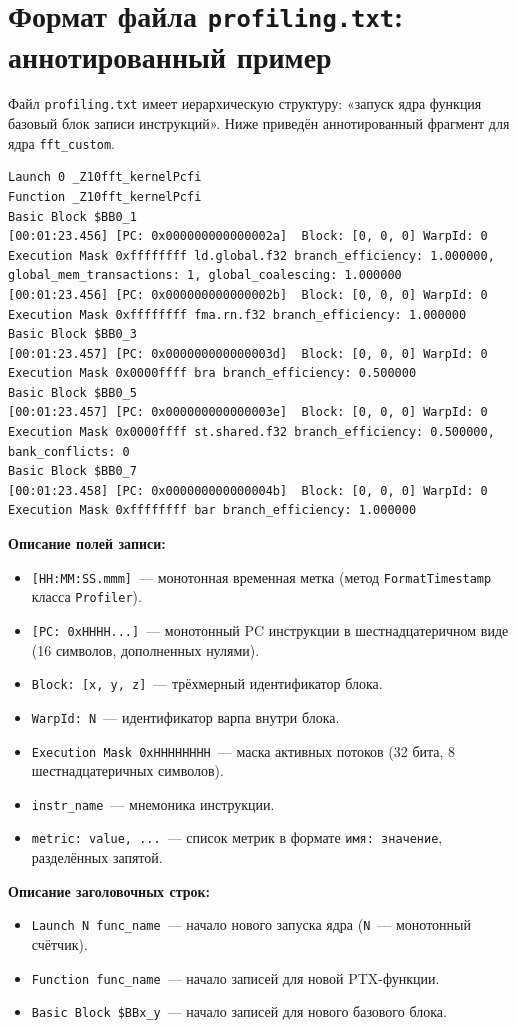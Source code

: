 \section{Формат файла \texttt{profiling.txt}: аннотированный пример}
\label{app:profiling_format}

Файл \texttt{profiling.txt} имеет иерархическую структуру:
«запуск ядра \textrightarrow{} функция \textrightarrow{} базовый блок \textrightarrow{} записи инструкций».
Ниже приведён аннотированный фрагмент для ядра \texttt{fft\_custom}.

\begin{lstlisting}[caption={Пример profiling.txt для fft\_custom}]
Launch 0 _Z10fft_kernelPcfi
Function _Z10fft_kernelPcfi
Basic Block $BB0_1
[00:01:23.456] [PC: 0x000000000000002a]  Block: [0, 0, 0] WarpId: 0 Execution Mask 0xffffffff ld.global.f32 branch_efficiency: 1.000000, global_mem_transactions: 1, global_coalescing: 1.000000
[00:01:23.456] [PC: 0x000000000000002b]  Block: [0, 0, 0] WarpId: 0 Execution Mask 0xffffffff fma.rn.f32 branch_efficiency: 1.000000
Basic Block $BB0_3
[00:01:23.457] [PC: 0x000000000000003d]  Block: [0, 0, 0] WarpId: 0 Execution Mask 0x0000ffff bra branch_efficiency: 0.500000
Basic Block $BB0_5
[00:01:23.457] [PC: 0x000000000000003e]  Block: [0, 0, 0] WarpId: 0 Execution Mask 0x0000ffff st.shared.f32 branch_efficiency: 0.500000, bank_conflicts: 0
Basic Block $BB0_7
[00:01:23.458] [PC: 0x000000000000004b]  Block: [0, 0, 0] WarpId: 0 Execution Mask 0xffffffff bar branch_efficiency: 1.000000
\end{lstlisting}

\textbf{Описание полей записи:}
\begin{itemize}
  \item \texttt{[HH:MM:SS.mmm]}~--- монотонная временная метка
        (метод \texttt{FormatTimestamp} класса \texttt{Profiler}).
  \item \texttt{[PC: 0xHHHH...]}~--- монотонный PC инструкции
        в шестнадцатеричном виде (16 символов, дополненных нулями).
  \item \texttt{Block: [x, y, z]}~--- трёхмерный идентификатор блока.
  \item \texttt{WarpId: N}~--- идентификатор варпа внутри блока.
  \item \texttt{Execution Mask 0xHHHHHHHH}~--- маска активных потоков (32 бита, 8 шестнадцатеричных символов).
  \item \texttt{instr\_name}~--- мнемоника инструкции.
  \item \texttt{metric: value, ...}~--- список метрик в формате \texttt{имя: значение}, разделённых запятой.
\end{itemize}

\textbf{Описание заголовочных строк:}
\begin{itemize}
  \item \texttt{Launch N func\_name}~--- начало нового запуска ядра (\texttt{N}~--- монотонный счётчик).
  \item \texttt{Function func\_name}~--- начало записей для новой PTX-функции.
  \item \texttt{Basic Block \$BBx\_y}~--- начало записей для нового базового блока.
\end{itemize}
